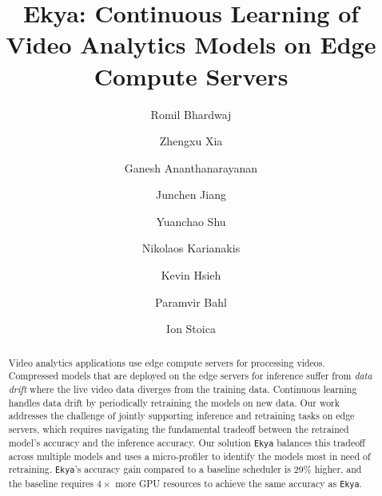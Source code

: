 \documentclass[letterpaper,twocolumn,10pt]{article}
\newcommand{\name}{{\tt Ekya}\xspace}
\begin{document}
\author[1,2]{Romil Bhardwaj}
\author[3]{Zhengxu Xia}
\author[1]{Ganesh Ananthanarayanan}
\author[3]{Junchen Jiang}
\author[1]{Yuanchao Shu}
\author[1]{Nikolaos Karianakis}
\author[1]{Kevin Hsieh}
\author[1]{Paramvir Bahl}
\author[2]{Ion Stoica}



\date{}
\title{\Large \bf Ekya: Continuous Learning of Video Analytics Models on Edge Compute Servers}

\maketitle

\begin{abstract}
Video analytics applications use edge compute servers for processing videos.  
Compressed models that are deployed on the edge servers for inference suffer from {\em data drift} where the live video data diverges from the training data. Continuous learning handles data drift by periodically retraining the models on new data. Our work addresses the challenge of jointly supporting inference and retraining tasks on edge servers, which requires navigating the fundamental tradeoff between the retrained model's accuracy and the inference accuracy. 
Our solution \name balances this tradeoff across multiple models and uses a micro-profiler to identify the models most in need of retraining. {\name}'s accuracy gain compared to a baseline scheduler is $29\%$ higher, and the baseline requires $4\times$ more GPU resources to achieve the same accuracy as \name.
\end{abstract}





% 
%
% 
% 












%
% 
\end{document}
